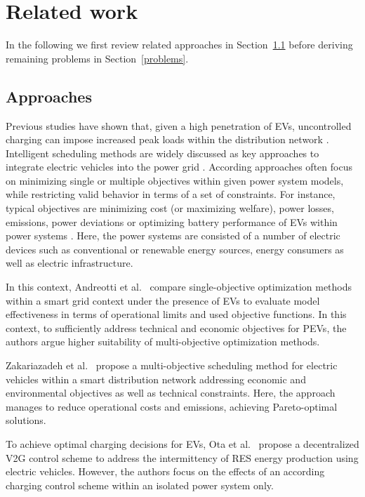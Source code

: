 \section{Related work}
\label{related_work}

In the following we first review related approaches in Section~\ref{approaches} before deriving remaining problems in Section~\ref{problems}.

\subsection{Approaches}
\label{approaches}


Previous studies have shown that, given a high penetration of EVs, uncontrolled charging can impose increased peak loads within the distribution network \cite{lopes2009identifying}. Intelligent scheduling methods are widely discussed as key approaches to integrate electric vehicles into the power grid \cite{yang2015computational}. According approaches often focus on minimizing single or multiple objectives within given power system models, while restricting valid behavior in terms of a set of constraints. For instance, typical objectives are minimizing cost (or maximizing welfare), power losses, emissions, power deviations or optimizing battery performance of EVs within power systems \cite{yang2015computational}. Here, the power systems are consisted of a number of electric devices such as conventional or renewable energy sources, energy consumers as well as electric infrastructure.

In this context, Andreotti et al.~\cite{andreotti2012review} compare single-objective optimization methods within a smart grid context under the presence of EVs to evaluate model effectiveness in terms of operational limits and used objective functions. In this context, to sufficiently address technical and economic objectives for PEVs, the authors argue higher suitability of multi-objective optimization methods. 

Zakariazadeh et al.~\cite{zakariazadeh2014multi} propose a multi-objective scheduling method for electric vehicles within a smart distribution network addressing economic and environmental objectives as well as technical constraints. Here, the approach manages to reduce operational costs and emissions, achieving Pareto-optimal solutions.

To achieve optimal charging decisions for EVs, Ota et al.~\cite{ota2012autonomous} propose a decentralized V2G control scheme to address the intermittency of RES energy production using electric vehicles. However, the authors focus on the effects of an according charging control scheme within an isolated power system only.

